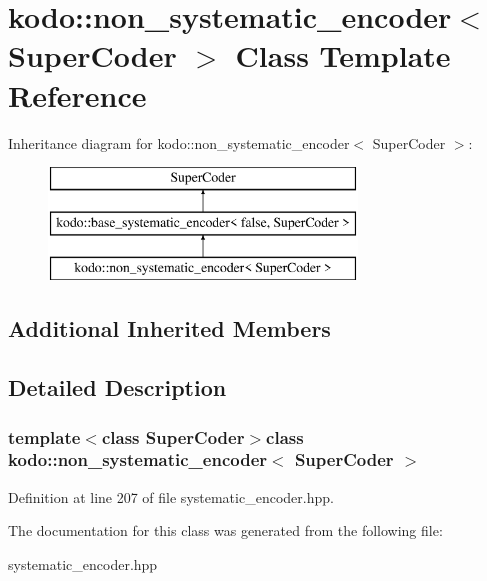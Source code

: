 \hypertarget{classkodo_1_1non__systematic__encoder}{\section{kodo\-:\-:non\-\_\-systematic\-\_\-encoder$<$ Super\-Coder $>$ Class Template Reference}
\label{classkodo_1_1non__systematic__encoder}
}
Inheritance diagram for kodo\-:\-:non\-\_\-systematic\-\_\-encoder$<$ Super\-Coder $>$\-:\begin{figure}[H]
\begin{center}
\leavevmode
\includegraphics[height=3.000000cm]{classkodo_1_1non__systematic__encoder}
\end{center}
\end{figure}
\subsection*{Additional Inherited Members}


\subsection{Detailed Description}
\subsubsection*{template$<$class Super\-Coder$>$class kodo\-::non\-\_\-systematic\-\_\-encoder$<$ Super\-Coder $>$}



Definition at line 207 of file systematic\-\_\-encoder.\-hpp.



The documentation for this class was generated from the following file\-:\begin{DoxyCompactItemize}
\item 
systematic\-\_\-encoder.\-hpp\end{DoxyCompactItemize}
